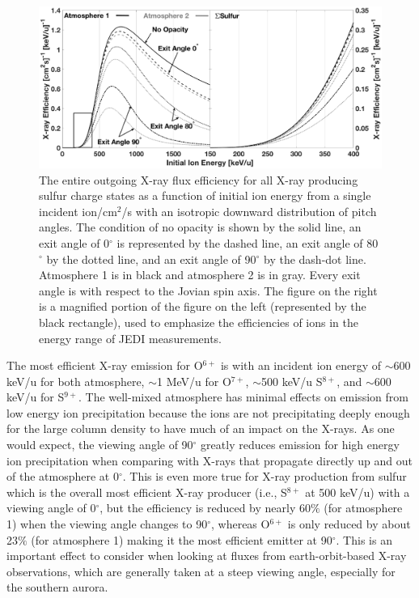 \documentclass[draft]{agujournal2018}
\begin{document}
\begin{figure}
    \centering
    \includegraphics[width=\textwidth]{Figures/SulXrayEff2.eps}
    \caption{The entire outgoing X-ray flux efficiency for all X-ray producing sulfur charge states as a function of initial ion energy from a single incident ion/cm$^2$/s with an isotropic downward distribution of pitch angles. The condition of no opacity is shown by the solid line, an exit angle of 0$^{\circ}$ is represented by the dashed line, an exit angle of 80$^{\circ}$ by the dotted line, and an exit angle of 90$^{\circ}$ by the dash-dot line. Atmosphere 1 is in black and atmosphere 2 is in gray. Every exit angle is with respect to the Jovian spin axis. The figure on the right is a magnified portion of the figure on the left (represented by the black rectangle), used to emphasize the efficiencies of ions in the energy range of JEDI measurements.}
    \label{fig:SulXrayEff}
\end{figure}

The most efficient X-ray emission for O$^{6+}$ is with an incident ion energy of $\sim$600 keV/u for both atmosphere, $\sim$1 MeV/u for O$^{7+}$, $\sim$500 keV/u S$^{8+}$, and $\sim$600 keV/u for S$^{9+}$.
The well-mixed atmosphere has minimal effects on emission from low energy ion precipitation because the ions are not precipitating deeply enough for the large column density to have much of an impact on the X-rays.
As one would expect, the viewing angle of 90$^{\circ}$ greatly reduces emission for high energy ion precipitation when comparing with X-rays that propagate directly up and out of the atmosphere at 0$^{\circ}$.
This is even more true for X-ray production from sulfur which is the overall most efficient X-ray producer (i.e., S$^{8+}$ at 500 keV/u) with a viewing angle of 0$^{\circ}$, but the efficiency is reduced by nearly 60$\%$ (for atmosphere 1) when the viewing angle changes to 90$^{\circ}$, whereas O$^{6+}$ is only reduced by about 23$\%$ (for atmosphere 1) making it the most efficient emitter at 90$^{\circ}$.
This is an important effect to consider when looking at fluxes from earth-orbit-based X-ray observations, which are generally taken at a steep viewing angle, especially for the southern aurora.
\end{document}
